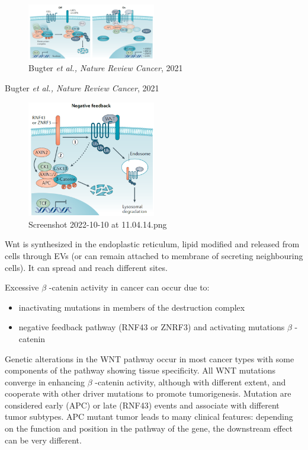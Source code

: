 \begin{figure}
\centering
\includegraphics[width=0.5\textwidth]{../_resources/Screenshot_2022-10-10_at_11-03-55.png}
\caption{Bugter \emph{et al., Nature Review Cancer}, 2021}
\end{figure}

Bugter \emph{et al., Nature Review Cancer}, 2021

\begin{figure}
\centering
\includegraphics[width=0.5\textwidth]{../_resources/Screenshot_2022-10-10_at_11-04-14.png}
\caption{Screenshot 2022-10-10 at 11.04.14.png}
\end{figure}

Wnt is synthesized in the endoplastic reticulum, lipid modified and released from cells through EVs (or can remain attached to membrane of secreting neighbouring cells). It can spread and reach different sites.

Excessive $\beta$  -catenin activity in cancer can occur due to:

\begin{itemize}
\tightlist
\item
  inactivating mutations in members of the destruction complex
\item
  negative feedback pathway (RNF43 or ZNRF3) and activating mutations $\beta$  -catenin
\end{itemize}

Genetic alterations in the WNT pathway occur in most cancer types with some components of the pathway showing tissue specificity. All WNT mutations converge in enhancing $\beta$  -catenin activity, although with different extent, and cooperate with other driver mutations to promote tumorigenesis. Mutation are considered early (APC) or late (RNF43) events and associate with different tumor subtypes. APC mutant tumor leads to many clinical features: depending on the function and position in the pathway of the gene, the downstream effect can be very different.

